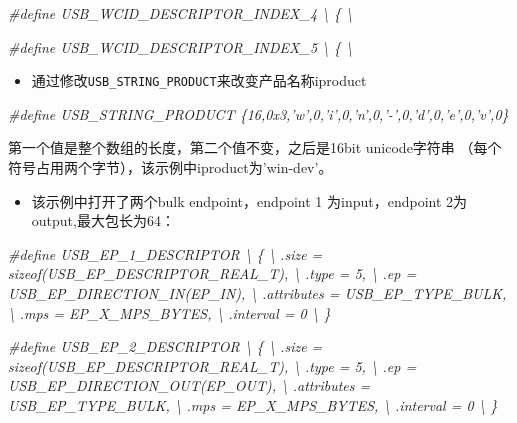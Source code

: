 \documentclass[
  12pt,
]{book}
\newenvironment{Shaded}{\begin{snugshade}}{\end{snugshade}}
\newcommand{\PreprocessorTok}[1]{\textcolor[rgb]{0.56,0.35,0.01}{\textit{#1}}}
\providecommand{\tightlist}{%
  \setlength{\itemsep}{0pt}\setlength{\parskip}{0pt}}
\begin{document}
\begin{Shaded}
\begin{Highlighting}[]
\PreprocessorTok{#define USB_WCID_DESCRIPTOR_INDEX_4 \textbackslash{}}
\PreprocessorTok{\{ \textbackslash{}}

\PreprocessorTok{#define USB_WCID_DESCRIPTOR_INDEX_5 \textbackslash{}}
\PreprocessorTok{\{ \textbackslash{}}
\end{Highlighting}
\end{Shaded}

\begin{itemize}
\tightlist
\item
  通过修改\texttt{USB\_STRING\_PRODUCT}来改变产品名称iproduct
\end{itemize}

\begin{Shaded}
\begin{Highlighting}[]
\PreprocessorTok{#define USB_STRING_PRODUCT \{16,0x3,'w',0,'i',0,'n',0,'-',0,'d',0,'e',0,'v',0\}}
\end{Highlighting}
\end{Shaded}

第一个值是整个数组的长度，第二个值不变，之后是16bit unicode字符串 （每个符号占用两个字节），该示例中iproduct为'win-dev'。

\begin{itemize}
\tightlist
\item
  该示例中打开了两个bulk endpoint，endpoint 1 为input，endpoint 2为output,最大包长为64：
\end{itemize}

\begin{Shaded}
\begin{Highlighting}[]
\PreprocessorTok{#define USB_EP_1_DESCRIPTOR \textbackslash{}}
\PreprocessorTok{\{ \textbackslash{}}
\PreprocessorTok{  .size = sizeof(USB_EP_DESCRIPTOR_REAL_T), \textbackslash{}}
\PreprocessorTok{  .type = 5, \textbackslash{}}
\PreprocessorTok{  .ep = USB_EP_DIRECTION_IN(EP_IN), \textbackslash{}}
\PreprocessorTok{  .attributes = USB_EP_TYPE_BULK, \textbackslash{}}
\PreprocessorTok{  .mps = EP_X_MPS_BYTES, \textbackslash{}}
\PreprocessorTok{  .interval = 0 \textbackslash{}}
\PreprocessorTok{\}}

\PreprocessorTok{#define USB_EP_2_DESCRIPTOR \textbackslash{}}
\PreprocessorTok{\{ \textbackslash{}}
\PreprocessorTok{  .size = sizeof(USB_EP_DESCRIPTOR_REAL_T), \textbackslash{}}
\PreprocessorTok{  .type = 5, \textbackslash{}}
\PreprocessorTok{  .ep = USB_EP_DIRECTION_OUT(EP_OUT), \textbackslash{}}
\PreprocessorTok{  .attributes = USB_EP_TYPE_BULK, \textbackslash{}}
\PreprocessorTok{  .mps = EP_X_MPS_BYTES, \textbackslash{}}
\PreprocessorTok{  .interval = 0 \textbackslash{}}
\PreprocessorTok{\}}
\end{Highlighting}
\end{Shaded}
\end{document}
